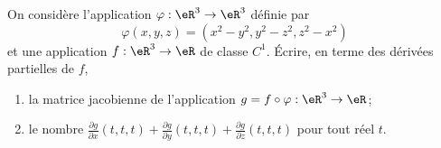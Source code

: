 \begin{exercice}\label{exoCalculDifferentiel0006}


 On considère l'application $\varphi :\eR^3\to \eR^3$ définie par
 \begin{equation}
	\varphi (x,y,z)= (x^2-y^2, y^2-z^2, z^2-x^2)
 \end{equation}
et une application $f:\eR^3\to \eR$ de classe $C^1$. Écrire, en terme des dérivées partielles de $f$,
\begin{enumerate}
	\item
 la matrice jacobienne de l'application $g=f\circ \varphi :\eR^3\to \eR$;
\item
le nombre $\displaystyle \frac{\partial g}{\partial x}(t,t,t)+ \displaystyle \frac{\partial g}{\partial y}(t,t,t)+ \displaystyle \frac{\partial g}{\partial z}(t,t,t) $ pour tout réel $t$.
\end{enumerate}

\end{exercice}
